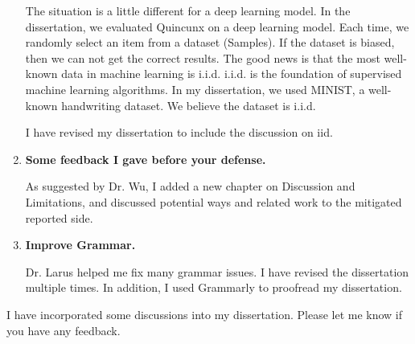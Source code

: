 \documentclass{article}
\begin{document}
\begin{enumerate}
The situation is a little different for a deep learning model. In the dissertation, we evaluated Quincunx on a deep learning model. Each time, we randomly select an item from a dataset (Samples). If the dataset is biased, then we can not get the correct results. The good news is that the most well-known data in machine learning is i.i.d. i.i.d. is the foundation of supervised machine learning algorithms. In my dissertation, we used MINIST, a well-known handwriting dataset. We believe the dataset is i.i.d.

I have revised my dissertation to include the discussion on iid.


\item \textbf{Some feedback I gave before your defense.}

As suggested by Dr. Wu, I added a new chapter on Discussion and Limitations, and discussed potential ways and related work to the mitigated reported side.

\item \textbf{Improve Grammar.}

Dr. Larus helped me fix many grammar issues. I have revised the dissertation multiple times. In addition, I used Grammarly to proofread my dissertation.
\end{enumerate}

I have incorporated some discussions into my dissertation. Please let me know if you have any feedback.
\end{document}
